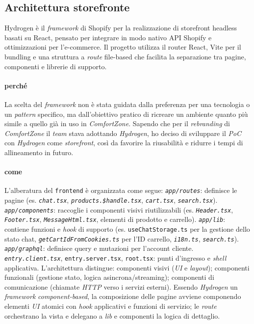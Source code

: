 \subsection{Architettura storefronte}
Hydrogen è il \emph{framework} di Shopify per la realizzazione di storefront headless basati su React, pensato per integrare in modo nativo API Shopify e ottimizzazioni per l’e-commerce. 
Il progetto utilizza il router React, Vite per il bundling e una struttura a \emph{route} file-based che facilita la separazione tra pagine, componenti e librerie di supporto.

\paragraph{\textbf{perché}}
La scelta del \emph{framework} non è stata guidata dalla preferenza per una tecnologia o un \emph{pattern} specifico, ma dall’obiettivo pratico di ricreare un ambiente quanto più simile 
a quello già in uso in \emph{ComfortZone}. Sapendo che per il \emph{rebranding} di \emph{ComfortZone} il \emph{team} stava adottando \emph{Hydrogen}, ho deciso di sviluppare 
il \emph{PoC} con \emph{Hydrogen} come \emph{storefront}, così da favorire la riusabilità e ridurre i tempi di allineamento in futuro.

\paragraph{\textbf{come}}
L’alberatura del \texttt{frontend} è organizzata come segue:
\texttt{\emph{app/routes}}: definisce le pagine (es. \texttt{\emph{chat.tsx}}, \texttt{\emph{products.\$handle.tsx}}, \texttt{\emph{cart.tsx}}, 
\texttt{\emph{search.tsx}}).
\texttt{\emph{app/components}}: raccoglie i componenti visivi riutilizzabili 
(es. \texttt{\emph{Header.tsx}}, \texttt{\emph{Footer.tsx}}, 
\texttt{\emph{MessageHtml.tsx}}, elementi di prodotto e carrello).
\texttt{\emph{app/lib}}: contiene funzioni e \emph{hook} di supporto (es. \texttt{useChatStorage.ts} per la gestione dello stato chat, \texttt{\emph{getCartIdFromCookies.ts}} per l’ID carrello, 
\texttt{\emph{i18n.ts}}, \texttt{\emph{search.ts}}).
\texttt{\emph{app/graphql}}: definisce query e mutazioni per l’account cliente.
\texttt{\emph{entry.client.tsx}}, \texttt{entry.server.tsx}, \texttt{root.tsx}: punti d’ingresso e \emph{shell} applicativa.
L’architettura distingue:
componenti visivi (\emph{UI} e \emph{layout});
componenti funzionali (gestione stato, logica asincrona/streaming);
componenti di comunicazione (chiamate \emph{HTTP} verso i servizi esterni).
Essendo \emph{Hydrogen} un \emph{framework} \emph{component-based}, la composizione delle pagine avviene componendo elementi \emph{UI} atomici con \emph{hook} applicativi e funzioni di servizio; 
le \emph{route} orchestrano la vista e delegano a \emph{lib} e componenti la logica di dettaglio.

